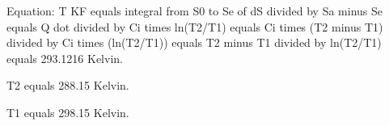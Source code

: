 Equation: 
T KF equals integral from S0 to Se of dS divided by Sa minus Se equals Q dot divided by Ci times ln(T2/T1) equals Ci times (T2 minus T1) divided by Ci times (ln(T2/T1)) equals T2 minus T1 divided by ln(T2/T1) equals 293.1216 Kelvin.

T2 equals 288.15 Kelvin.

T1 equals 298.15 Kelvin.